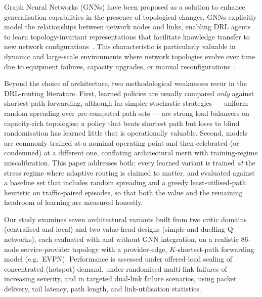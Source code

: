 \documentclass[10pt,journal,comsoc]{IEEEtran}
\begin{document}
Graph Neural Networks (GNNs) have been proposed as a solution to enhance generalisation capabilities in the presence of topological changes. GNNs explicitly model the relationships between network nodes and links, enabling DRL agents to learn topology-invariant representations that facilitate knowledge transfer to new network configurations~\cite{bhavanasi2022routing,he2023routing,li2022applications}. This characteristic is particularly valuable in dynamic and large-scale environments where network topologies evolve over time due to equipment failures, capacity upgrades, or manual reconfigurations~\cite{almasan2022deep}.

Beyond the choice of architecture, two methodological weaknesses recur in the DRL-routing literature. First, learned policies are usually compared \emph{only} against shortest-path forwarding, although far simpler stochastic strategies --- uniform random spreading over pre-computed path sets --- are strong load balancers on capacity-rich topologies; a policy that beats shortest path but loses to blind randomisation has learned little that is operationally valuable. Second, models are commonly trained at a nominal operating point and then celebrated (or condemned) at a different one, conflating architectural merit with training-regime miscalibration. This paper addresses both: every learned variant is trained \emph{at} the stress regime where adaptive routing is claimed to matter, and evaluated against a baseline set that includes random spreading and a greedy least-utilised-path heuristic on traffic-paired episodes, so that both the value and the remaining headroom of learning are measured honestly.

Our study examines seven architectural variants built from two critic domains (centralised and local) and two value-head designs (simple and duelling Q-networks), each evaluated with and without GNN integration, on a realistic 86-node service-provider topology with a provider-edge, $K$-shortest-path forwarding model (e.g.\ EVPN). Performance is assessed under offered-load scaling of concentrated (hotspot) demand, under randomised multi-link failures of increasing severity, and in targeted dual-link failure scenarios, using packet delivery, tail latency, path length, and link-utilisation statistics.
\end{document}
